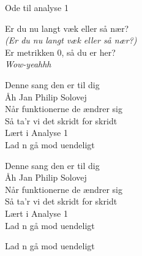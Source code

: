 \begin{song}{Ode til analyse 1}
  \begin{SBSection*}
    Er du nu langt væk eller så nær?\\
    \emph{(Er du nu langt væk eller så nær?)}\\
    Er metrikken 0, så du er her?\\
    \emph{Wow-yeahhh}
  \end{SBSection*}

  \begin{SBChorus}
    Denne sang den er til dig\\
    Åh Jan Philip Solovej\\
    Når funktionerne de ændrer sig\\
    \medskip
    Så ta’r vi det skridt for skridt\\
    Lært i Analyse 1\\
    Lad n gå mod uendeligt
  \end{SBChorus}

  \begin{SBChorus}
    Denne sang den er til dig\\
    Åh Jan Philip Solovej\\
    Når funktionerne de ændrer sig\\
    \medskip
    Så ta’r vi det skridt for skridt\\
    Lært i Analyse 1\\
    Lad n gå mod uendeligt
  \end{SBChorus}

  \begin{SBSection*}
    Lad n gå mod uendeligt
  \end{SBSection*}
\end{song}
